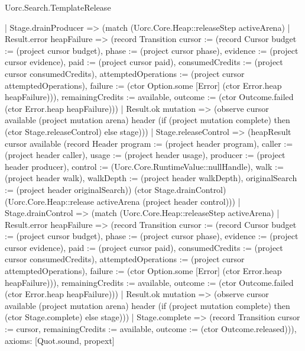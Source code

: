 \begin{lexlean}{Uorc.Search.TemplateRelease}
\begin{semanticmodule}
{    | Stage.drainProducer => (match (Uorc.Core.Heap::releaseStep activeArena)
      | Result.error heapFailure => (record Transition {cursor := (record Cursor {budget := (project cursor budget), phase := (project cursor phase), evidence := (project cursor evidence), paid := (project cursor paid), consumedCredits := (project cursor consumedCredits), attemptedOperations := (project cursor attemptedOperations), failure := (ctor Option.some [Error] (ctor Error.heap heapFailure))}), remainingCredits := available, outcome := (ctor Outcome.failed (ctor Error.heap heapFailure))})
      | Result.ok mutation => (observe cursor available (project mutation arena) header (if (project mutation complete) then (ctor Stage.releaseControl) else stage)))
    | Stage.releaseControl => (heapResult cursor available (record Header {program := (project header program), caller := (project header caller), usage := (project header usage), producer := (project header producer), control := (Uorc.Core.RuntimeValue::nullHandle), walk := (project header walk), walkDepth := (project header walkDepth), originalSearch := (project header originalSearch)}) (ctor Stage.drainControl) (Uorc.Core.Heap::release activeArena (project header control)))
    | Stage.drainControl => (match (Uorc.Core.Heap::releaseStep activeArena)
      | Result.error heapFailure => (record Transition {cursor := (record Cursor {budget := (project cursor budget), phase := (project cursor phase), evidence := (project cursor evidence), paid := (project cursor paid), consumedCredits := (project cursor consumedCredits), attemptedOperations := (project cursor attemptedOperations), failure := (ctor Option.some [Error] (ctor Error.heap heapFailure))}), remainingCredits := available, outcome := (ctor Outcome.failed (ctor Error.heap heapFailure))})
      | Result.ok mutation => (observe cursor available (project mutation arena) header (if (project mutation complete) then (ctor Stage.complete) else stage)))
    | Stage.complete => (record Transition {cursor := cursor, remainingCredits := available, outcome := (ctor Outcome.released)})),
  axioms: [Quot.sound, propext]
}


\end{semanticmodule}
\end{lexlean}
